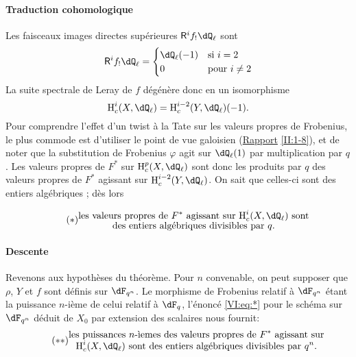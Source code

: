 \paragraph{Traduction cohomologique}
Les faisceaux images directes sup\'erieures $\R^i f_!\dQ_\ell$ sont 
\[
  \R^i f_!\dQ_\ell = \begin{cases}
                       \dQ_\ell(-1) & \text{si $i = 2$} \\
                       0            & \text{pour $i\ne 2$}
                     \end{cases}
\]
La suite spectrale de Leray de $f$ d\'eg\'en\`ere donc en un isomorphisme 
\[
  \h_c^i(X,\dQ_\ell) = \h_c^{i-2}(Y,\dQ_\ell)(-1) \text{.}
\]
Pour comprendre l'effet d'un twist \`a la Tate sur les valeurs propres de 
Frobenius, le plus commode est d'utiliser le point de vue galoisien 
(\hyperref[II]{Rapport} \ref{II:1-8}), et de noter que la substitution de 
Frobenius $\varphi$ agit sur $\dQ_\ell(1)$ par multiplication par $q$. Les 
valeurs propres de $F^\ast$ sur $\h_c^p(X,\dQ_\ell)$ sont donc les produits par 
$q$ des valeurs propres de $F^\ast$ agissant sur $\h_c^{i-2}(Y,\dQ_\ell)$. On 
sait que celles-ci sont des entiers alg\'ebriques \cite[XXI 5.2.2]{sga7}; d\`es 
lors 

\begin{equation*}\tag{$*$}\label{VI:eq:*}
  \substack{\displaystyle\text{les valeurs propres de $F^\ast$ agissant sur $\h_c^i(X,\dQ_\ell)$ sont} \\
  \displaystyle\text{des entiers alg\'ebriques divisibles par $q$.}}
\end{equation*}


\paragraph{Descente}
Revenons aux hypoth\`eses du th\'eor\`eme. Pour $n$ convenable, on peut 
supposer que $\rho$, $Y$ et $f$ sont d\'efinis sur $\dF_{q^n}$. Le morphisme de 
Frobenius relatif \`a $\dF_{q^n}$ \'etant la puissance $n$-i\`eme de celui 
relatif \`a $\dF_q$, l'\'enonc\'e \eqref{VI:eq:*} pour le sch\'ema sur 
$\dF_{q^n}$ d\'eduit de $X_0$ par extension des scalaires nous fournit: 
\begin{equation*}\tag{$**$}\label{VI:eq:**}
  \substack{\displaystyle\text{les puissances $n$-\`iemes des valeurs propres de $F^\ast$ agissant sur} \\ \displaystyle\text{$\h_c^i(X,\dQ_\ell)$ sont des entiers alg\'ebriques divisibles par $q^n$.}}
\end{equation*}

